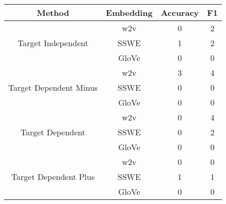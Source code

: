\begin{tabular}{|c|c|c|c|}
\hline
Method &    Embedding   &  Accuracy &  F1 \\
\hline
\multirow{3}{*}{Target Independent} & w2v &         0 &   2 \\
& SSWE &         1 &   2 \\
& GloVe &         0 &   0 \\
\hline
\multirow{3}{*}{Target Dependent Minus} & w2v &         3 &   4 \\
& SSWE &         0 &   0 \\
& GloVe &         0 &   0 \\
\hline
\multirow{3}{*}{Target Dependent} & w2v &         0 &   4 \\
& SSWE &         0 &   2 \\
& GloVe &         0 &   0 \\
\hline
\multirow{3}{*}{Target Dependent Plus} & w2v &         0 &   0 \\
& SSWE &         1 &   1 \\
& GloVe &         0 &   0 \\
\hline
\end{tabular}